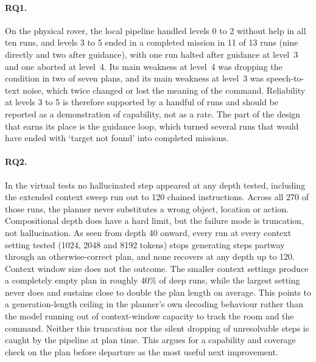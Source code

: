 \label{chap:conclusion}
\label{sec:answers}

\paragraph{RQ1.} On the physical rover, the local pipeline handled levels 0 to 2
without help in all ten runs, and levels 3 to 5 ended in a completed mission in
11 of 13 runs (nine directly and two after guidance), with one run halted after
guidance at level~3 and one aborted at level~4. Its main weakness at level~4 was
dropping the condition in two of seven plans, and its main weakness at level~3
was speech-to-text noise, which twice changed or lost the meaning of the
command. Reliability at levels 3 to 5 is therefore supported by a handful of
runs and should be reported as a demonstration of capability, not as a rate.
The part of the design that earns its place is the guidance loop, which turned
several runs that would have ended with `target not found' into completed
missions.

\paragraph{RQ2.} In the virtual tests no hallucinated step appeared at any
depth tested, including the extended context sweep run out to 120 chained
instructions. Across all 270 of those runs, the planner never substitutes a
wrong object, location or action. Compositional depth does have a hard limit,
but the failure mode is truncation, not hallucination. As seen from depth 40 onward,
every run at every context setting tested (1024, 2048 and 8192 tokens) stops
generating steps partway through an otherwise-correct plan, and none recovers
at any depth up to 120. Context window size does not the outcome. 
The smaller context settings produce a completely
empty plan in roughly 40\% of deep runs, while the largest setting never does
and sustains close to double the plan length on average. This points to a
generation-length ceiling in the planner's own decoding behaviour rather than
the model running out of context-window capacity to track the room and the
command. Neither this truncation nor the silent dropping of unresolvable steps
is caught by the pipeline at plan time. This argues for a capability and
coverage check on the plan before departure as the most useful next
improvement.

